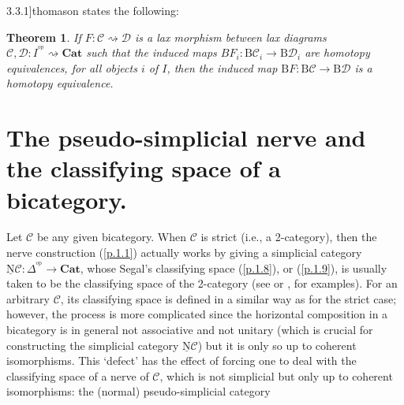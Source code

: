 \documentclass[]{amsart}
\newtheorem{theorem}{Theorem}[section]
\begin{document}
3.3.1]{thomason} states the following:
\begin{theorem}\label{p.1.23} If $F:{\ensuremath{\mathcal{C}}}\rightsquigarrow{\ensuremath{\mathcal{D}}}$ is a lax morphism between lax diagrams ${\ensuremath{\mathcal{C}}},{\ensuremath{\mathcal{D}}}:  I^{^{\mathrm{op}}}\rightsquigarrow{\ensuremath{\mathbf{Cat}}}$ such that the induced maps $BF_i:{\ensuremath{\mathrm{B}}} {\ensuremath{\mathcal{C}}}_i\to {\ensuremath{\mathrm{B}}}{\ensuremath{\mathcal{D}}}_i$ are homotopy equivalences, for all objects $i$ of
$I$, then the induced map ${\ensuremath{\mathrm{B}}} F:{\ensuremath{\mathrm{B}}}{\ensuremath{\mathcal{C}}} \to {\ensuremath{\mathrm{B}}}{\ensuremath{\mathcal{D}}}$ is a homotopy equivalence.
\end{theorem}

\section{The pseudo-simplicial nerve and the classifying space of a bicategory.}

Let ${\ensuremath{\mathcal{C}}}$ be any given bicategory. When ${\ensuremath{\mathcal{C}}}$ is strict (i.e., a 2-category),  then the nerve
construction (\ref{p.1.1}) actually works by giving a simplicial category ${\ensuremath{\underline{\mathrm{N}}}}
{\ensuremath{\mathcal{C}}}:\Delta^{\!^{\mathrm{op}}}\to {\ensuremath{\mathbf{Cat}}}$, whose Segal's classifying space (\ref{p.1.8}), or
(\ref{p.1.9}), is usually taken to be the classifying space of the 2-category (see \cite{b-c,
hinich, moerdijk-svensson, til, til2} or \cite{thomason}, for examples). For an arbitrary ${\ensuremath{\mathcal{C}}}$, its
classifying space is defined in a similar way as for the strict case; however, the process is more
complicated since the horizontal composition in a bicategory is in general not associative and not
unitary (which is crucial for constructing the simplicial category ${\ensuremath{\underline{\mathrm{N}}}}{\ensuremath{\mathcal{C}}}$) but it is only so up
to coherent isomorphisms. This  `defect'  has the effect of forcing one to deal with the
classifying space of a nerve of ${\ensuremath{\mathcal{C}}}$, which is not simplicial but only up to coherent isomorphisms:
the (normal) pseudo-simplicial category
\end{document}

